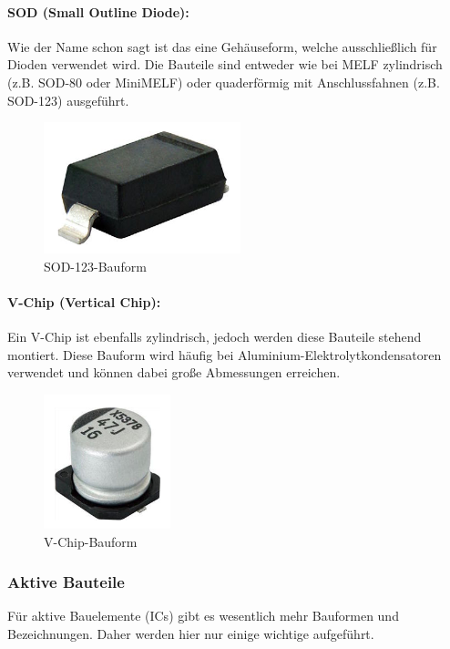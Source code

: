 \paragraph{SOD (Small Outline Diode):}
Wie der Name schon sagt ist das eine Gehäuseform, welche ausschließlich für Dioden verwendet wird. Die Bauteile sind entweder wie bei MELF zylindrisch (z.B. SOD-80 oder MiniMELF) oder quaderförmig mit Anschlussfahnen (z.B. SOD-123) ausgeführt.
\begin{figure}[H]
	\centering
	\includegraphics{images/technische_grundlagen/sod-123.png}
	\caption{SOD-123-Bauform \cite[vgl.][]{vishay-sod-123}}
\end{figure}

\paragraph{V-Chip (Vertical Chip):}
Ein V-Chip ist ebenfalls zylindrisch, jedoch werden diese Bauteile stehend montiert.
Diese Bauform wird häufig bei Aluminium-Elektrolytkondensator\-en verwendet und können dabei große Abmessungen erreichen.
\begin{figure}[H]
	\centering
	\includegraphics{images/technische_grundlagen/vchip.png}
	\caption{V-Chip-Bauform \cite[vgl.][]{vishay-vchip}}
\end{figure}

\subsubsection{Aktive Bauteile}
Für aktive Bauelemente (ICs) gibt es wesentlich mehr Bauformen und Bezeichnungen. Daher werden hier nur einige wichtige aufgeführt.
